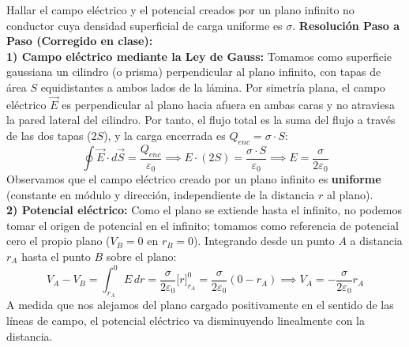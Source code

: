 \begin{ejercicio}
Hallar el campo eléctrico y el potencial creados por un plano infinito no conductor cuya densidad superficial de carga uniforme es $\sigma$.
\tcbline
\textbf{Resolución Paso a Paso (Corregido en clase):}\\[4pt]
\textbf{1) Campo eléctrico mediante la Ley de Gauss:}
Tomamos como superficie gaussiana un cilindro (o prisma) perpendicular al plano infinito, con tapas de área $S$ equidistantes a ambos lados de la lámina. Por simetría plana, el campo eléctrico $\vec{E}$ es perpendicular al plano hacia afuera en ambas caras y no atraviesa la pared lateral del cilindro. Por tanto, el flujo total es la suma del flujo a través de las dos tapas ($2S$), y la carga encerrada es $Q_{enc} = \sigma \cdot S$:
\begin{equation}
    \oint \vec{E} \cdot d\vec{S} = \frac{Q_{enc}}{\varepsilon_0} \implies E \cdot (2S) = \frac{\sigma \cdot S}{\varepsilon_0} \implies \boxed{E = \frac{\sigma}{2\varepsilon_0}}
\end{equation}
Observamos que el campo eléctrico creado por un plano infinito es \textbf{uniforme} (constante en módulo y dirección, independiente de la distancia $r$ al plano).\\[4pt]
\textbf{2) Potencial eléctrico:}
Como el plano se extiende hasta el infinito, no podemos tomar el origen de potencial en el infinito; tomamos como referencia de potencial cero el propio plano ($V_B = 0$ en $r_B = 0$). Integrando desde un punto $A$ a distancia $r_A$ hasta el punto $B$ sobre el plano:
\begin{equation}
    V_A - V_B = \int_{r_A}^{0} E\, dr = \frac{\sigma}{2\varepsilon_0} \Big[r\Big]_{r_A}^{0} = \frac{\sigma}{2\varepsilon_0} (0 - r_A) \implies \boxed{V_A = -\frac{\sigma}{2\varepsilon_0} r_A}
\end{equation}
A medida que nos alejamos del plano cargado positivamente en el sentido de las líneas de campo, el potencial eléctrico va disminuyendo linealmente con la distancia.
\end{ejercicio}

